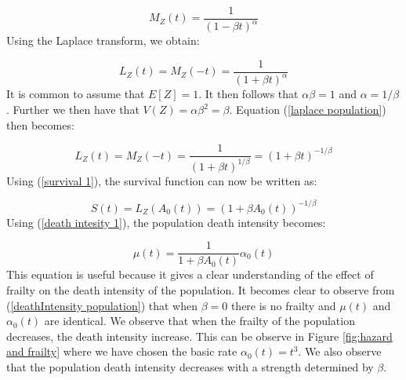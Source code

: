 \begin{equation*}
     M_{Z}(t) = \frac{1}{(1 - \beta t)^\alpha}
\end{equation*}
Using the Laplace transform, we obtain:


\begin{equation}
     L_{Z}(t)  =  M_{Z}(-t) = \frac{1}{(1 + \beta t)^\alpha}
     \label{laplace population}
\end{equation}
It is common to assume that $ E[Z] = 1 $.
It then follows that $ \alpha \beta  = 1 $ and $ \alpha = 1 / \beta$.
Further we then have that $ V(Z) = \alpha \beta ^2 = \beta $.
Equation (\ref{laplace population}) then becomes:


\begin{equation}
     L_{Z}(t)  =  M_{Z}(-t) = \frac{1}{(1 + \beta t)^{1 / \beta}} = ( 1 + \beta t )^{-1 / \beta}
\end{equation}
Using (\ref{survival 1}), the survival function can now be written as:


\begin{equation}
   S(t) =  L_{Z}(A_{0}(t)) 
        = ( 1 + \beta A_{0}(t) )^{-1 / \beta} 
\end{equation}
Using (\ref{death intesity 1}), the population death intensity becomes:


\begin{equation}
     \mu(t) = \frac{1}{1 + \beta A_{0}(t)} \alpha_{0}(t)
     \label{deathIntensity population}
\end{equation}
This equation is useful because it gives a clear understanding of the effect of frailty on the death intensity of the population.
It becomes clear to observe from (\ref{deathIntensity population}) that when $\beta = 0 $ there is no frailty and $ \mu(t)$ and $\alpha_{0}(t)$ are identical.
We observe that when the frailty of the population decreases, the death intensity increase.
This can be observe in Figure \ref{fig:hazard and frailty} where we have chosen the basic rate $\alpha_{0}(t) = t^3$. We also observe that the population death intensity decreases with a strength determined by $\beta$.


